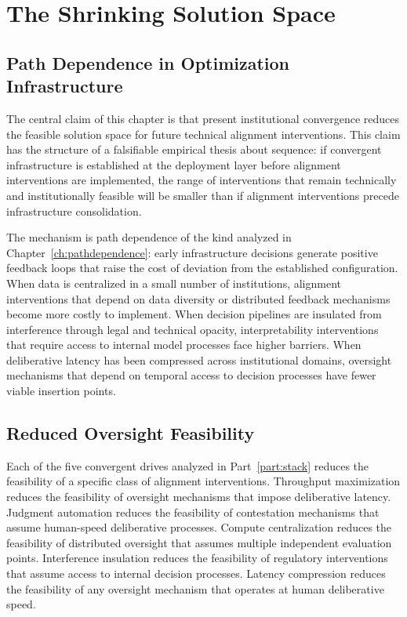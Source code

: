 \documentclass[12pt, oneside]{book}
\theoremstyle{plain}
\theoremstyle{definition}
\theoremstyle{remark}
\theoremstyle{definition}
\begin{document}
\chapter{The Shrinking Solution Space}
\label{ch:shrinking}

\section{Path Dependence in Optimization Infrastructure}

The central claim of this chapter is that present institutional convergence
reduces the feasible solution space for future technical alignment interventions.
This claim has the structure of a falsifiable empirical thesis about sequence: if
convergent infrastructure is established at the deployment layer before alignment
interventions are implemented, the range of interventions that remain technically
and institutionally feasible will be smaller than if alignment interventions precede
infrastructure consolidation.

The mechanism is path dependence of the kind analyzed in Chapter~\ref{ch:pathdependence}:
early infrastructure decisions generate positive feedback loops that raise the cost
of deviation from the established configuration. When data is centralized in a small
number of institutions, alignment interventions that depend on data diversity or
distributed feedback mechanisms become more costly to implement. When decision
pipelines are insulated from interference through legal and technical opacity,
interpretability interventions that require access to internal model processes face
higher barriers. When deliberative latency has been compressed across institutional
domains, oversight mechanisms that depend on temporal access to decision processes
have fewer viable insertion points.

\section{Reduced Oversight Feasibility}

Each of the five convergent drives analyzed in Part~\ref{part:stack} reduces the
feasibility of a specific class of alignment interventions. Throughput maximization
reduces the feasibility of oversight mechanisms that impose deliberative latency.
Judgment automation reduces the feasibility of contestation mechanisms that assume
human-speed deliberative processes. Compute centralization reduces the feasibility
of distributed oversight that assumes multiple independent evaluation points.
Interference insulation reduces the feasibility of regulatory interventions that
assume access to internal decision processes. Latency compression reduces the
feasibility of any oversight mechanism that operates at human deliberative speed.
\end{document}
